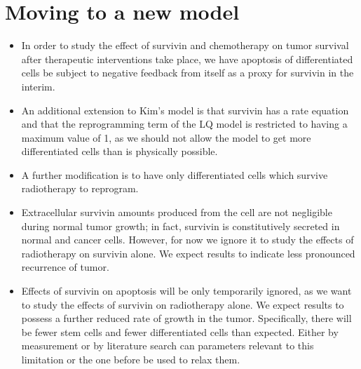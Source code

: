 \documentclass[12pt]{article}
\begin{document}
\section*{Moving to a new model}
\begin{itemize}
\item In order to study the effect of survivin and chemotherapy on tumor survival after therapeutic interventions take place, we have apoptosis of differentiated cells be subject to negative feedback from itself as a proxy for survivin in the interim.
\item An additional extension to Kim's model is that survivin has a rate equation and that the reprogramming term of the LQ model is restricted to having a maximum value of 1, as we should not allow the model to get more differentiated cells than is physically possible.
\item A further modification is to have only differentiated cells which survive radiotherapy to reprogram.
\item Extracellular survivin amounts produced from the cell are not negligible during normal tumor growth; in fact, survivin is constitutively secreted in normal and cancer cells. However, for now we ignore it to study the effects of radiotherapy on survivin alone. We expect results to indicate less pronounced recurrence of tumor.
\item Effects of survivin on apoptosis will be only temporarily ignored, as we want to study the effects of survivin on radiotherapy alone. We expect results to possess a further reduced rate of growth in the tumor. Specifically, there will be fewer stem cells and fewer differentiated cells than expected. Either by measurement or by literature search can parameters relevant to this limitation or the one before be used to relax them.
\end{itemize}
\end{document}
